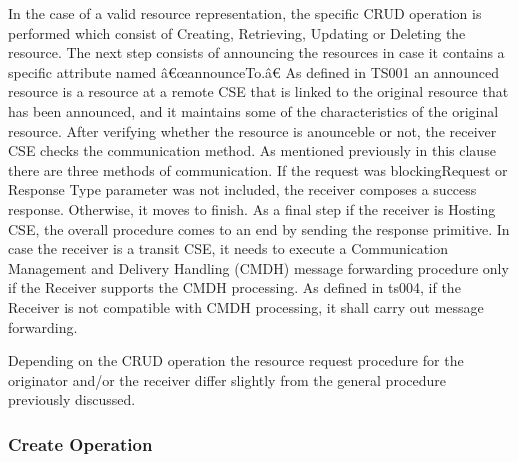 In the case of a valid resource representation, the specific CRUD operation is performed which consist of Creating, Retrieving, Updating or Deleting the resource. The next step consists of announcing the resources in case it contains a specific attribute named â€œannounceTo.â€ As defined in TS001 an announced resource is a resource at a remote CSE that is linked to the original resource that has been announced, and it maintains some of the characteristics of the original resource. After verifying whether the resource is anounceble or not, the receiver CSE checks the communication method. As mentioned previously in this clause there are three methods of communication. If the request was blockingRequest or Response Type parameter was not included, the receiver composes a success response. Otherwise, it moves to finish. As a final step if the receiver is Hosting CSE, the overall procedure comes to an end by sending the response primitive. In case the receiver is a transit CSE, it needs to execute a Communication Management and Delivery Handling (CMDH) message forwarding procedure only if the Receiver supports the CMDH processing. As defined in ts004, if the Receiver is not compatible with CMDH processing, it shall carry out message forwarding.\item
Depending on the CRUD operation the resource request procedure for the originator and/or the receiver differ slightly from the general procedure previously discussed.\par
\subsubsection*{Create Operation }

